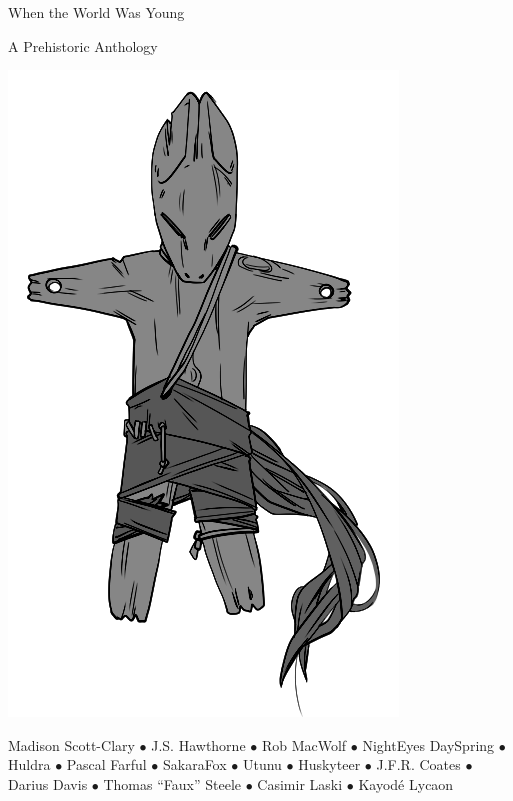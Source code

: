 \documentclass[11pt]{memoir}
\begin{document}
  \frontmatter
  \pagestyle{empty}


  \begin{flushright}
  \null
  \vfill
  \large{}
  
  \vfill
  \end{flushright}

  \cleardoublepage
  \doublespacing

  \begin{center}
    \TitleFamily
    \Huge{When the World Was Young}

    \vfill

    \large{ A Prehistoric Anthology}
    
    \vfill

    \includegraphics{assets/toy-bw.png}
    
    \vfill
  
    \normalfont\small
    Madison Scott-Clary $\bullet$
    J.S. Hawthorne $\bullet$
    Rob MacWolf $\bullet$
    NightEyes DaySpring $\bullet$
    Huldra $\bullet$
    Pascal Farful $\bullet$
    SakaraFox $\bullet$
    Utunu $\bullet$
    Huskyteer $\bullet$
    J.F.R. Coates $\bullet$
    Darius Davis $\bullet$
    Thomas ``Faux'' Steele $\bullet$
    Casimir Laski $\bullet$
    Kayodé Lycaon
  \end{center}
  \thispagestyle{empty}
\end{document}
